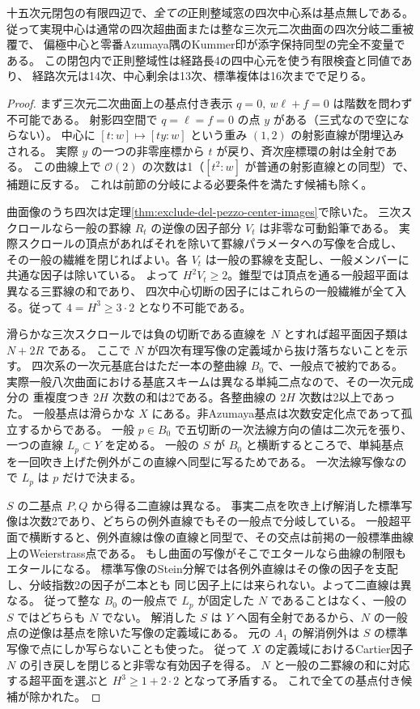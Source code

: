 \begin{theorem}\label{thm:main-domain-quartic-parameters}
十五次元閉包の有限四辺で、\emph{全ての}正則整域窓の四次中心系は基点無しである。
従って実現中心は通常の四次超曲面または整な三次元二次曲面の四次分岐二重被覆で、
偏極中心と零番Azumaya隅のKummer印が添字保持同型の完全不変量である。
この閉包内で正則整域性は経路長4の四中心元を使う有限検査と同値であり、
経路次元は14次、中心剰余は13次、標準複体は16次までで足りる。
\end{theorem}
\begin{proof}
まず三次元二次曲面上の基点付き表示 $q=0,\ w\ell+f=0$ は階数を問わず不可能である。
射影四空間で $q=\ell=f=0$ の点 $y$ がある（三式なので空にならない）。
中心に $[t:w]\mapsto[t y:w]$ という重み $(1,2)$ の射影直線が閉埋込みされる。
実際 $y$ の一つの非零座標から $t$ が戻り、斉次座標環の射は全射である。
この曲線上で $\mathcal O(2)$ の次数は1（$[t^2:w]$ が普通の射影直線との同型）で、補題に反する。
これは前節の分岐による必要条件を満たす候補も除く。

曲面像のうち四次は定理\ref{thm:exclude-del-pezzo-center-images}で除いた。
三次スクロールなら一般の罫線 $R_t$ の逆像の因子部分 $V_t$ は非零な可動鉛筆である。
実際スクロールの頂点があればそれを除いて罫線パラメータへの写像を合成し、
その一般の繊維を閉じればよい。各 $V_t$ は一般の罫線を支配し、一般メンバーに共通な因子は除いている。
よって $H^2V_t\ge2$。錐型では頂点を通る一般超平面は異なる三罫線の和であり、
四次中心切断の因子にはこれらの一般繊維が全て入る。従って $4=H^3\ge 3\cdot2$ となり不可能である。

滑らかな三次スクロールでは負の切断である直線を $N$ とすれば超平面因子類は $N+2R$ である。
ここで $N$ が四次有理写像の定義域から抜け落ちないことを示す。
四次系の一次元基底台はただ一本の整曲線 $B_0$ で、一般点で被約である。
実際一般八次曲面における基底スキームは異なる単純二点なので、その一次元成分の
重複度つき $2H$ 次数の和は2である。各整曲線の $2H$ 次数は2以上であった。
一般基点は滑らかな $X$ にある。非Azumaya基点は次数安定化点であって孤立するからである。
一般 $p\in B_0$ で五切断の一次法線方向の値は二次元を張り、一つの直線 $L_p\subset Y$ を定める。
一般の $S$ が $B_0$ と横断するところで、単純基点を一回吹き上げた例外がこの直線へ同型に写るためである。
一次法線写像なので $L_p$ は $p$ だけで決まる。

$S$ の二基点 $P,Q$ から得る二直線は異なる。
事実二点を吹き上げ解消した標準写像は次数2であり、どちらの例外直線でもその一般点で分岐している。
一般超平面で横断すると、例外直線は像の直線と同型で、その交点は前掲の一般標準曲線上のWeierstrass点である。
もし曲面の写像がそこでエタールなら曲線の制限もエタールになる。
標準写像のStein分解では各例外直線はその像の因子を支配し、分岐指数2の因子が二本とも
同じ因子上には来られない。よって二直線は異なる。
従って整な $B_0$ の一般点で $L_p$ が固定した $N$ であることはなく、一般の $S$ ではどちらも $N$ でない。
解消した $S$ は $Y$ へ固有全射であるから、$N$ の一般点の逆像は基点を除いた写像の定義域にある。
元の $A_1$ の解消例外は $S$ の標準写像で点にしか写らないことも使った。
従って $X$ の定義域におけるCartier因子 $N$ の引き戻しを閉じると非零な有効因子を得る。
$N$ と一般の二罫線の和に対応する超平面を選ぶと $H^3\ge1+2\cdot2$ となって矛盾する。
これで全ての基点付き候補が除かれた。


\end{proof}
